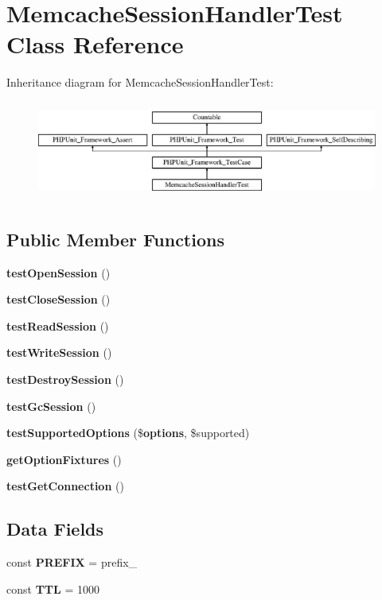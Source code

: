 \section{Memcache\+Session\+Handler\+Test Class Reference}
\label{class_symfony_1_1_component_1_1_http_foundation_1_1_tests_1_1_session_1_1_storage_1_1_handler_1_1_memcache_session_handler_test}
Inheritance diagram for Memcache\+Session\+Handler\+Test\+:\begin{figure}[H]
\begin{center}
\leavevmode
\includegraphics[height=3.303835cm]{class_symfony_1_1_component_1_1_http_foundation_1_1_tests_1_1_session_1_1_storage_1_1_handler_1_1_memcache_session_handler_test}
\end{center}
\end{figure}
\subsection*{Public Member Functions}
\begin{DoxyCompactItemize}
\item 
{\bf test\+Open\+Session} ()
\item 
{\bf test\+Close\+Session} ()
\item 
{\bf test\+Read\+Session} ()
\item 
{\bf test\+Write\+Session} ()
\item 
{\bf test\+Destroy\+Session} ()
\item 
{\bf test\+Gc\+Session} ()
\item 
{\bf test\+Supported\+Options} (\${\bf options}, \$supported)
\item 
{\bf get\+Option\+Fixtures} ()
\item 
{\bf test\+Get\+Connection} ()
\end{DoxyCompactItemize}
\subsection*{Data Fields}
\begin{DoxyCompactItemize}
\item 
const {\bf P\+R\+E\+F\+I\+X} = \textquotesingle{}prefix\+\_\+\textquotesingle{}
\item 
const {\bf T\+T\+L} = 1000
\end{DoxyCompactItemize}
